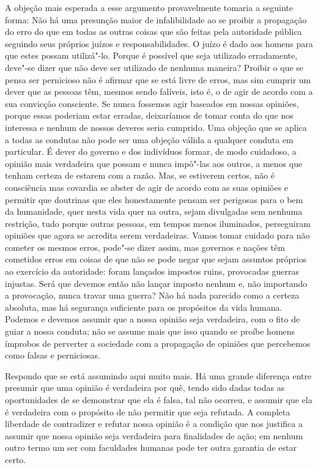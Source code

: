 A objeção mais esperada a esse argumento provavelmente tomaria a
seguinte forma: Não há uma presunção maior de infalibilidade ao se
proibir a propagação do erro do que em todas as outras coisas que são
feitas pela autoridade pública seguindo seus próprios juízos e
responsabilidades. O juízo é dado aos homens para que estes possam
utilizá"-lo. Porque é possível que seja utilizado erradamente, deve"-se dizer
que não deve ser utilizado de nenhuma maneira? Proibir o que se pensa
ser pernicioso não é afirmar que se está livre de erros, mas sim
cumprir um dever que as pessoas têm, mesmos sendo falíveis, isto é, o de agir
de acordo com a sua convicção consciente. Se nunca fossemos agir
baseados em nossas opiniões, porque essas poderiam estar erradas,
deixaríamos de tomar conta do que nos interessa e nenhum de nossos
deveres seria cumprido. Uma objeção que se aplica a todas as condutas
não pode ser uma objeção válida a qualquer conduta em particular. É
dever do governo e dos indivíduos formar, de modo cuidadoso, a opinião
mais verdadeira que possam e nunca impô"-las aos outros, a menos
que tenham certeza de estarem com a razão. Mas, se estiverem certos,
não é consciência mas covardia se abster de agir de acordo com as suas 
opiniões e permitir que doutrinas que eles honestamente pensam
ser perigosas para o bem da humanidade, quer nesta vida quer na outra,
sejam divulgadas sem nenhuma restrição, tudo porque outras pessoas, em
tempos menos iluminados, perseguiram opiniões que agora se acredita
serem verdadeiras. Vamos tomar cuidado para não cometer os mesmos
erros, pode"-se dizer assim, mas governos e nações têm cometidos erros
em coisas de que não se pode negar que sejam assuntos próprios ao
exercício da autoridade: foram lançados impostos ruins, provocadas
guerras injustas. Será que devemos então não lançar imposto nenhum e,
não importando a provocação, nunca travar uma guerra? Não há nada
parecido como a certeza absoluta, mas há segurança suficiente para os
propósitos da vida humana. Podemos e devemos assumir que a nossa
opinião seja verdadeira, com o fito de guiar a nossa conduta; não se
assume mais que isso quando se proíbe homens ímprobos de perverter a
sociedade com a propagação de opiniões que percebemos como falsas e perniciosas. 

Respondo que se está assumindo aqui muito mais. Há uma grande
diferença entre presumir que uma opinião é verdadeira por quê, tendo sido
dadas todas as oportunidades de se demonstrar que ela é falsa, tal não
ocorreu, e assumir que ela é verdadeira com o propósito de não permitir
que seja refutada. A completa liberdade de contradizer e refutar nossa
opinião é a condição que nos justifica a assumir que nossa opinião seja
verdadeira para finalidades de ação; em nenhum outro termo um ser
com faculdades humanas pode ter outra garantia de estar certo.

